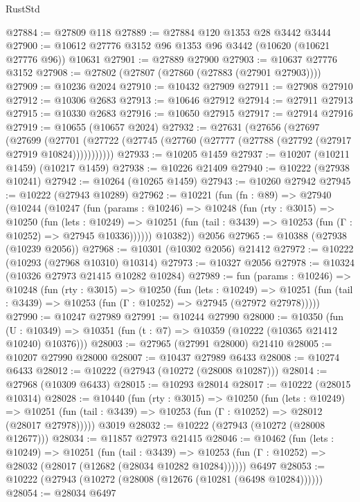 \begin{lexlean}{RustStd}
\begin{coremodule}
@27884 := @27809 @118
@27889 := @27884 @120 @1353 @28 @3442 @3444
@27900 := @10612 @27776 @3152 @96 @1353 @96 @3442 (@10620 (@10621 @27776 @96)) @10631
@27901 := @27889 @27900
@27903 := @10637 @27776 @3152
@27908 := @27802 (@27807 (@27860 (@27883 (@27901 @27903))))
@27909 := @10236 @2024
@27910 := @10432 @27909
@27911 := @27908 @27910
@27912 := @10306 @2683
@27913 := @10646 @27912
@27914 := @27911 @27913
@27915 := @10330 @2683
@27916 := @10650 @27915
@27917 := @27914 @27916
@27919 := @10655 (@10657 @2024)
@27932 := @27631
    (@27656
      (@27697
        (@27699
          (@27701 (@27722 (@27745 (@27760 (@27777 (@27788 (@27792 (@27917 @27919 @10824)))))))))))
@27933 := @10205 @1459
@27937 := @10207 (@10211 @1459) (@10217 @1459)
@27938 := @10226 @21409
@27940 := @10222 (@27938 @10241)
@27942 := @10264 (@10265 @1459)
@27943 := @10260 @27942
@27945 := @10222 (@27943 @10289)
@27962 := @10221
    (fun (fn : @89) =>
    @27940
      (@10244
        (@10247
          (fun (params : @10246) =>
          @10248
            (fun (rty : @3015) =>
            @10250
              (fun (lets : @10249) =>
              @10251 (fun (tail : @3439) => @10253 (fun (Γ : @10252) => @27945 @10336))))))
        @10382))
    @2056
@27965 := @10388 (@27938 (@10239 @2056))
@27968 := @10301 (@10302 @2056) @21412
@27972 := @10222 (@10293 (@27968 @10310) @10314)
@27973 := @10327 @2056
@27978 := @10324 (@10326 @27973 @21415 @10282 @10284)
@27989 := fun (params : @10246) =>
  @10248
    (fun (rty : @3015) =>
    @10250
      (fun (lets : @10249) =>
      @10251 (fun (tail : @3439) => @10253 (fun (Γ : @10252) => @27945 (@27972 @27978)))))
@27990 := @10247 @27989
@27991 := @10244 @27990
@28000 := @10350
    (fun (U : @10349) => @10351 (fun (t : @7) => @10359 (@10222 (@10365 @21412 @10240) @10376)))
@28003 := @27965 (@27991 @28000) @21410
@28005 := @10207 @27990 @28000
@28007 := @10437 @27989 @6433
@28008 := @10274 @6433
@28012 := @10222 (@27943 (@10272 (@28008 @10287)))
@28014 := @27968 (@10309 @6433)
@28015 := @10293 @28014
@28017 := @10222 (@28015 @10314)
@28028 := @10440
    (fun (rty : @3015) =>
    @10250
      (fun (lets : @10249) =>
      @10251 (fun (tail : @3439) => @10253 (fun (Γ : @10252) => @28012 (@28017 @27978)))))
    @3019
@28032 := @10222 (@27943 (@10272 (@28008 @12677)))
@28034 := @11857 @27973 @21415
@28046 := @10462
    (fun (lets : @10249) =>
    @10251
      (fun (tail : @3439) =>
      @10253 (fun (Γ : @10252) => @28032 (@28017 (@12682 (@28034 @10282 @10284))))))
    @6497
@28053 := @10222 (@27943 (@10272 (@28008 (@12676 (@10281 (@6498 @10284))))))
@28054 := @28034 @6497

\end{coremodule}
\end{lexlean}
